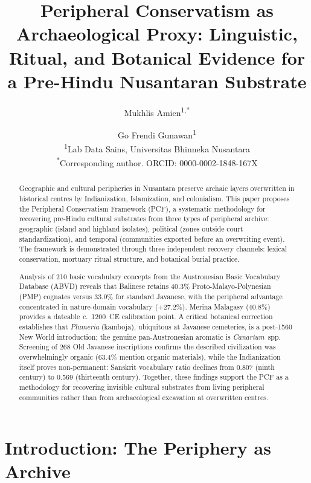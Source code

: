 \documentclass[12pt,a4paper]{article}
\title{\textbf{Peripheral Conservatism as Archaeological Proxy: Linguistic, Ritual, and Botanical Evidence for a Pre-Hindu Nusantaran Substrate}}
\author{Mukhlis Amien\textsuperscript{1,*} \and Go Frendi Gunawan\textsuperscript{1}\\[6pt]
\small \textsuperscript{1}Lab Data Sains, Universitas Bhinneka Nusantara\\
\small \textsuperscript{*}Corresponding author. ORCID: 0000-0002-1848-167X}
\date{}
\begin{document}
\maketitle
\thispagestyle{empty}

\begin{abstract}
\noindent
Geographic and cultural peripheries in Nusantara preserve archaic layers overwritten in historical centres by Indianization, Islamization, and colonialism. This paper proposes the Peripheral Conservatism Framework (PCF), a systematic methodology for recovering pre-Hindu cultural substrates from three types of peripheral archive: geographic (island and highland isolates), political (zones outside court standardization), and temporal (communities exported before an overwriting event). The framework is demonstrated through three independent recovery channels: lexical conservation, mortuary ritual structure, and botanical burial practice.

Analysis of 210 basic vocabulary concepts from the Austronesian Basic Vocabulary Database (ABVD) reveals that Balinese retains 40.3\% Proto-Malayo-Polynesian (PMP) cognates versus 33.0\% for standard Javanese, with the peripheral advantage concentrated in nature-domain vocabulary (+27.2\%). Merina Malagasy (40.8\%) provides a dateable \textit{c.}~1200~CE calibration point. A critical botanical correction establishes that \textit{Plumeria} (kamboja), ubiquitous at Javanese cemeteries, is a post-1560 New World introduction; the genuine pan-Austronesian aromatic is \textit{Canarium}~spp. Screening of 268 Old Javanese inscriptions confirms the described civilization was overwhelmingly organic (63.4\% mention organic materials), while the Indianization itself proves non-permanent: Sanskrit vocabulary ratio declines from 0.807 (ninth century) to 0.569 (thirteenth century). Together, these findings support the PCF as a methodology for recovering invisible cultural substrates from living peripheral communities rather than from archaeological excavation at overwritten centres.
\end{abstract}

\newpage
\setcounter{page}{1}

\section{Introduction: The Periphery as Archive}
\end{document}
